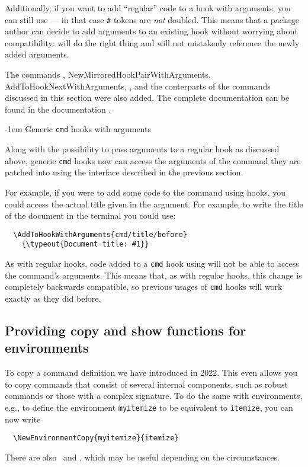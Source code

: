 \documentclass{ltnews}
\makeatletter
\providecommand\hook[1]{\texttt{#1}}
\providecommand\env[1]{\texttt{#1}}
\providecommand\env[1]{\texttt{#1}}
\renewcommand{\subsubsection}{%
   \@startsection      {subsubsection}{2}{0pt}{1.5ex \@plus 1ex \@minus .2ex}%
      {-1em}{\@subheadingfont\colonize}%
}
\providecommand\colonize[1]{#1:}
\makeatother
\begin{document}
Additionally, if you want to add \enquote{regular} code to a hook with
arguments, you can still use  --- in that case \verb|#|
tokens are \emph{not} doubled.  This means that a package author can
decide to add arguments to an existing hook without worrying about
compatibility:  will do the right thing and will not
mistakenly reference the newly added arguments.

The commands , \cs
{NewMirroredHookPairWithArguments}, \cs
{AddToHookNextWithArguments}, , and
the  conterparts of the commands discussed in this section
were also added.  The complete documentation can be found in the
 documentation \cite{37:lthooks-doc}.

\subsubsection{Generic \texttt{cmd} hooks with arguments}

Along with the possibility to pass arguments to a regular hook as
discussed above, generic \hook{cmd} hooks now can access the arguments
of the command they are patched into using the interface described in
the previous section.

For example, if you were to add some code to the  command
using hooks, you could access the actual title given in the argument.
For example, to write the title of the document in the terminal you
could use:
\begin{verbatim}
  \AddToHookWithArguments{cmd/title/before}
    {\typeout{Document title: #1}}
\end{verbatim}

As with regular hooks, code added to a \hook{cmd} hook using
 will not be able to access the command's arguments.  This
means that, as with regular hooks, this change is completely backwards
compatible, so previous usages of \hook{cmd} hooks will work exactly as
they did before.

\subsection{Providing copy and show functions for environments}

To copy a command definition we have introduced  in
2022.  This even allows you to copy commands that consist of several internal
components, such as robust commands or those with a complex signature.
To do the same with environments, e.g., to define the environment
\env{myitemize} to be equivalent to \env{itemize}, you can now write
\begin{verbatim}
  \NewEnvironmentCopy{myitemize}{itemize}
\end{verbatim}
There are also \ and , which may be useful
depending on the circumstances.
\end{document}
